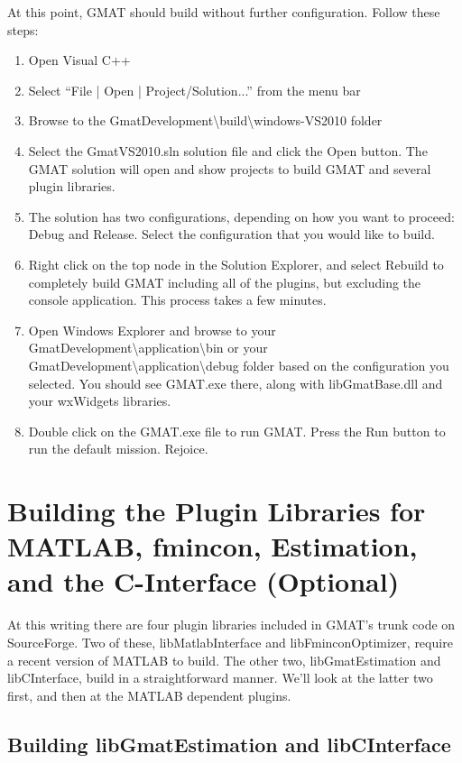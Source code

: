 \documentclass[letterpaper,10pt]{article}%
\begin{document}
{At this point, GMAT should build without further configuration.  Follow these steps:
\begin{enumerate}
\item Open Visual C++
\item Select ``File | Open | Project/Solution...'' from the menu bar
\item Browse to the GmatDevelopment\textbackslash build\textbackslash windows-VS2010 folder
\item Select the GmatVS2010.sln solution file and click the Open button.  The GMAT solution will open and show projects to build GMAT and several plugin libraries.
\item The solution has two configurations, depending on how you want to proceed: Debug and Release.  Select the configuration that you would like to build.
\item Right click on the top node in the Solution Explorer, and select Rebuild to completely build GMAT including all of the plugins, but excluding the console application.  This process takes a few minutes.
\item Open Windows Explorer and browse to your GmatDevelopment\textbackslash application\textbackslash bin or your GmatDevelopment\textbackslash application\textbackslash debug folder based on the configuration you selected.  You should see GMAT.exe there, along with libGmatBase.dll and your wxWidgets libraries.
\item Double click on the GMAT.exe file to run GMAT.  Press the Run button to run the default mission.  Rejoice.
\end{enumerate}

\section{Building the Plugin Libraries for MATLAB, fmincon, Estimation, and the C-Interface (Optional)}

At this writing there are four plugin libraries included in GMAT's trunk code on SourceForge.  Two of these, libMatlabInterface and libFminconOptimizer, require a recent version of MATLAB to build.  The other two, libGmatEstimation and libCInterface, build in a straightforward manner.  We'll look at the latter two first, and then at the MATLAB dependent plugins.

\subsection{Building libGmatEstimation and libCInterface}

}
\end{document}
